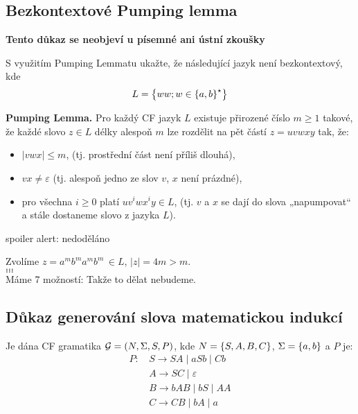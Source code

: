 \subsection{Bezkontextové Pumping lemma}
\textbf{Tento důkaz se neobjeví u písemné ani ústní zkoušky}

S využitím Pumping Lemmatu ukažte, že následující jazyk není bezkontextový, kde $$L = \left\lbrace ww; w \in \left\lbrace a,b \right\rbrace^{\star} \right\rbrace$$


\textbf{Pumping Lemma.} Pro každý CF jazyk $L$ existuje přirozené číslo $m \geq 1$ takové, že každé slovo $z \in L$
délky alespoň $m$ lze rozdělit na pět částí $z = uvwxy$ tak, že:

\begin{itemize}[label=\textbullet]
    \item $\lvert vwx \rvert \leq m$, (tj. prostřední část není příliš dlouhá),
    \item $vx \neq \varepsilon$ (tj. alespoň jedno ze slov $v$, $x$ není prázdné),
    \item pro všechna $i \geq 0$ platí $uv^i wx^i y \in L$, (tj. $v$ a $x$ se dají do slova „napumpovat“ a stále
    dostaneme slovo z jazyka $L$).
\end{itemize}

spoiler alert: nedoděláno

Zvolíme $z = a^m b^m a^m b^m \, \in L$, $|z| = 4m > m$. \\
$\dots$\\
$\dots$\\
$\dots$\\

Máme 7 možností:
Takže to dělat nebudeme.


\subsection{Důkaz generování slova matematickou indukcí} %
Je dána CF gramatika $\mathcal{G} = (N, \Sigma, S, P)$, kde $N = \left\lbrace S, A, B, C \right\rbrace$, $\Sigma = \left\lbrace a, b \right\rbrace$ a $P$ je:
\begin{align*}
    P \text{: } & S \rightarrow SA \mid aSb \mid Cb \\
       & A \rightarrow SC \mid \varepsilon \\
       & B \rightarrow bAB \mid bS \mid AA \\
       & C \rightarrow CB \mid bA \mid a \\
\end{align*}

